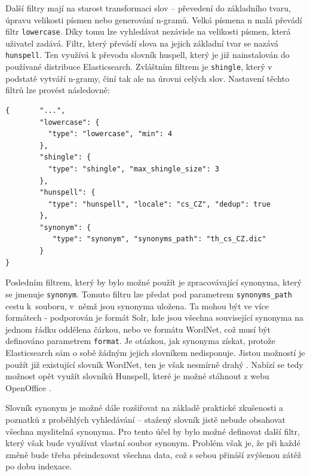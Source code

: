 \documentclass[FM,DP]{tulthesis}
\newenvironment{code}
    {\filbreak\captionsetup{type=listing}}{\filbreak}
\begin{document}
Další filtry mají na starost transformaci slov -- převedení do základního tvaru, 
úpravu velikosti písmen nebo generování n-gramů. Velká písmena n malá převádí filtr 
\verb|lowercase|. Díky tomu lze vyhledávat nezávisle na velikosti písmen, která uživatel zadává. 
Filtr, který převádí slova na jejich základní tvar se nazává \verb|hunspell|. Ten využívá
k převodu slovník huspell, který je již nainstalován do používané distribuce Elasticsearch.
Zvláštním filtrem je \verb|shingle|, který v podstatě vytváří n-gramy, činí tak ale na úrovni 
celých slov. Nastavení těchto filtrů lze provést následovně:

\begin{code}
\captionsetup{singlelinecheck=false,justification=raggedright}
\label{code:es-filters-2}
\begin{verbatim}
{       "...",
        "lowercase": {
          "type": "lowercase", "min": 4
        },
        "shingle": {
          "type": "shingle", "max_shingle_size": 3
        },
        "hunspell": {
          "type": "hunspell", "locale": "cs_CZ", "dedup": true
        },
        "synonym": {
           "type": "synonym", "synonyms_path": "th_cs_CZ.dic"
        }
}
\end{verbatim}
\end{code}

Posledním filtrem, který by bylo možné použít je zpracovávající synonyma, který se jmenuje 
\verb|synonym|. Tomuto filtru lze předat pod parametrem \verb|synonyms_path| cestu
k~souboru, v~němž jsou synonyma uložena. Ta mohou být ve více formátech - podporován
je formát Solr, kde jsou všechna související synonyma na jednom řádku oddělena čárkou,
nebo ve formátu WordNet, což musí být definováno parametrem \verb|format|.
Je otázkou, jak synonyma získat, protože Elasticsearch sám o sobě žádným jejich
slovníkem nedisponuje. Jistou možností je použít již existující slovník WordNet, 
ten je však nesmírně drahý \cite{wordnet}. Nabízí se tedy možnost opět využít slovníků
Hunspell, které je možné stáhnout z webu OpenOffice \cite{hunspell-download}.

Slovník synonym je možné dále rozšiřovat na základě praktické zkušenosti a poznatků
z proběhlých vyhledávání -- stažený slovník jistě nebude obsahovat všechna myslitelná
synonyma. Pro tento účel by bylo možné definovat další filtr, který však bude využívat
vlastní soubor synonym. Problém však je, že při každé změně bude třeba přeindexovat
všechna data, což s sebou přináší zvýšenou zátěž po dobu indexace.
\end{document}
